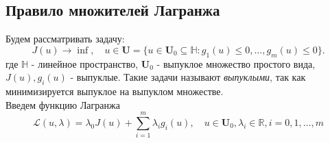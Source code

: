 \documentclass[A4]{article}
\begin{document}
\subsection{Правило множителей Лагранжа}
Будем рассматривать задачу:
\begin{equation*}
J(u)\rightarrow\inf,\quad u\in\mathbf{U}=\{u\in\mathbf{U}_0\subseteq\mathbb{H}:g_1(u)\leqslant 0,\ldots,g_m(u)\leqslant 0 \}.
\end{equation*}
где $\mathbb{H}$ - линейное пространство, $\mathbf{U}_0$ - выпуклое множество простого вида, $J(u),g_i(u)$ - выпуклые. Такие задачи называют \emph{выпуклыми}, так как минимизируется выпуклое на выпуклом множестве.\\
Введем функцию Лагранжа
\begin{equation*}
\mathcal{L}(u,\lambda) =\lambda_0 J(u)+\sum_{i=1}^{m}\lambda_ig_i(u),\quad u\in\mathbf{U}_0,\lambda_i\in\mathbb{R},i=0,1,\ldots,m
\end{equation*}
\end{document}
